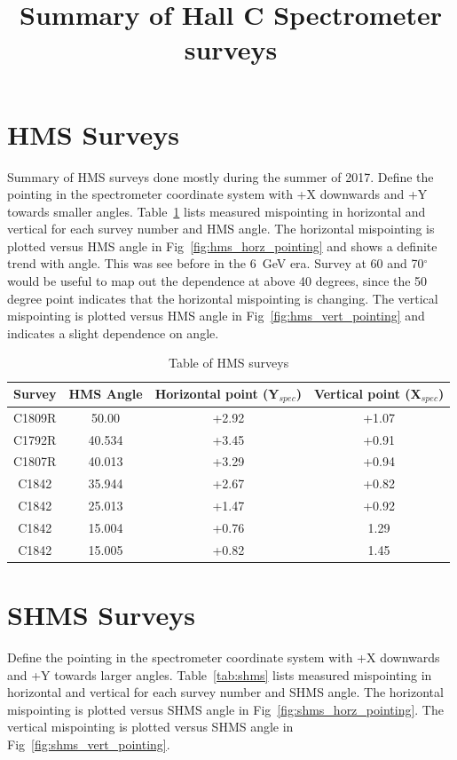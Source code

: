 \documentclass[]{article}
\title{Summary of Hall C Spectrometer surveys}
\begin{document}
\section{HMS Surveys}
	Summary of HMS surveys done mostly during the summer of 2017. Define the pointing in the spectrometer coordinate system with +X downwards and +Y towards smaller angles.
		Table~\ref{tab:hms} lists measured mispointing in horizontal and vertical for each survey number and HMS angle. The horizontal mispointing is plotted versus HMS angle in Fig~\ref{fig:hms_horz_pointing} and shows a definite trend with angle. This was see before in the 6~GeV era. Survey at 60 and 70$^{\circ}$ would be useful to map out the dependence at above 40 degrees, since the 50 degree point indicates that the horizontal mispointing is changing. The vertical mispointing is plotted versus
		HMS angle in Fig~\ref{fig:hms_vert_pointing} and indicates a slight dependence on
		angle.
	
	\begin{table}[h]
	\begin{center}
	\begin{tabular}[]{|c|c||c|c|} \hline\hline
		Survey & HMS Angle  & Horizontal point (Y$_{spec}$) & Vertical point (X$_{spec}$)\\ \hline
		C1809R & 50.00  & +2.92 & +1.07 \\ \hline
		C1792R & 40.534 & +3.45& +0.91\\ \hline
		C1807R & 40.013 & +3.29 & +0.94 \\ \hline
		C1842 & 35.944 & +2.67 & +0.82\\ \hline
		C1842  & 25.013 & +1.47 &  +0.92 \\ \hline
		C1842  & 15.004 & +0.76 & 1.29\\ \hline
			C1842  & 15.005 & +0.82 & 1.45 \\ \hline
	\end{tabular}
	\caption{Table of HMS surveys}
	\label{tab:hms}
				\end{center}
	\end{table}


\section{SHMS Surveys}
Define the pointing in the spectrometer coordinate system with +X downwards and +Y towards larger angles.
Table~\ref{tab:shms} lists measured mispointing in horizontal and vertical for each survey number and SHMS angle. The horizontal mispointing is plotted versus SHMS angle in Fig~\ref{fig:shms_horz_pointing}.  The vertical mispointing is plotted versus
SHMS angle in Fig~\ref{fig:shms_vert_pointing}. 
			
\end{document}
